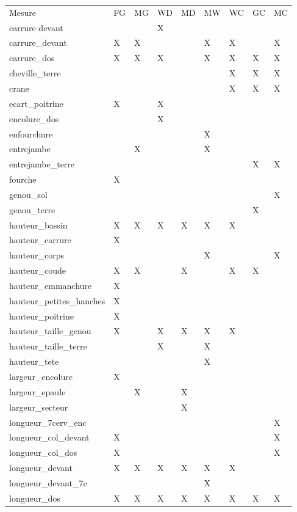 \begin{tabular}{lllllllll}

    Mesure& FG & MG & WD & MD & MW & WC & GC & MC\\ 
carrure devant&&&X&&&&&\\ \hline 
carrure\_devant&X&X&&&X&X&&X\\ \hline 
carrure\_dos&X&X&X&&X&X&X&X\\ \hline 
cheville\_terre&&&&&&X&X&X\\ \hline 
crane&&&&&&X&X&X\\ \hline 
ecart\_poitrine&X&&X&&&&&\\ \hline 
encolure\_dos&&&X&&&&&\\ \hline 
enfourchure&&&&&X&&&\\ \hline 
entrejambe&&X&&&X&&&\\ \hline 
entrejambe\_terre&&&&&&&X&X\\ \hline 
fourche&X&&&&&&&\\ \hline 
genou\_sol&&&&&&&&X\\ \hline 
genou\_terre&&&&&&&X&\\ \hline 
hauteur\_bassin&X&X&X&X&X&X&&\\ \hline 
hauteur\_carrure&X&&&&&&&\\ \hline 
hauteur\_corps&&&&&X&&&X\\ \hline 
hauteur\_coude&X&X&&X&&X&X&\\ \hline 
hauteur\_emmanchure&X&&&&&&&\\ \hline 
hauteur\_petites\_hanches&X&&&&&&&\\ \hline 
hauteur\_poitrine&X&&&&&&&\\ \hline 
hauteur\_taille\_genou&X&&X&X&X&X&&\\ \hline 
hauteur\_taille\_terre&&&X&&X&&&\\ \hline 
hauteur\_tete&&&&&X&&&\\ \hline 
largeur\_encolure&X&&&&&&&\\ \hline 
largeur\_epaule&&X&&X&&&&\\ \hline 
largeur\_secteur&&&&X&&&&\\ \hline 
longueur\_7cerv\_enc&&&&&&&&X\\ \hline 
longueur\_col\_devant&X&&&&&&&X\\ \hline 
longueur\_col\_dos&X&&&&&&&X\\ \hline 
longueur\_devant&X&X&X&X&X&X&&\\ \hline 
longueur\_devant\_7c&&&&&X&&&\\ \hline 
longueur\_dos&X&X&X&X&X&X&X&X\\ \hline 

\end{tabular}
